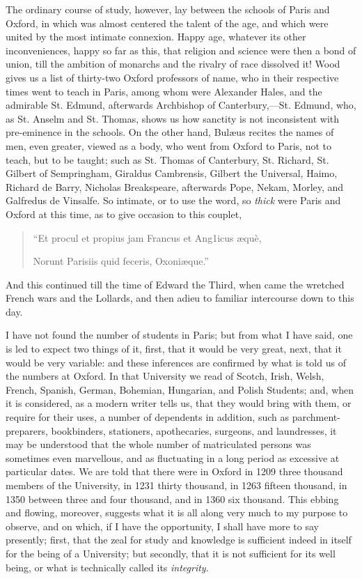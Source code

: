 The ordinary course of study,
however, lay between the schools of Paris and Oxford, in which
was almost centered the talent of the age, and which were united by
the most intimate connexion. Happy age, whatever its other
inconveniences, happy so far as this, that religion and science were
then a bond of union, till the ambition of monarchs and the rivalry of
race dissolved it! Wood gives us a list of thirty-two Oxford
professors of name, who in their respective times went to teach in
Paris, among whom were Alexander Hales, and the admirable St. Edmund,
afterwards Archbishop of Canterbury,—St. Edmund, who, as St. Anselm
and St. Thomas, shows us how sanctity is not inconsistent with
pre-eminence in the schools. On the other hand, Bulæus recites the
names of men, even greater, viewed as a body, who went from Oxford to
Paris, not to teach, but to be taught; such as St. Thomas of
Canterbury, St. Richard, St. Gilbert of Sempringham, Giraldus
Cambrensis, Gilbert the Universal, Haimo, Richard de Barry, Nicholas
Breakspeare, afterwards Pope, Nekam, Morley, and Galfredus de Vinsalfe.
So intimate, or to use the word, so \emph{thick} were Paris and Oxford at
this time, as to give occasion to this couplet,

\begin{quote}

``Et procul et propius jam
Francus et Ang1icus æquè,

Norunt Parisiis quid feceris, Oxoniæque.''

\end{quote}

And this continued till the
time of Edward the Third, when came the wretched French wars and the
Lollards, and then adieu to familiar intercourse down to this day.

I have not found the number of
students in Paris; but from what I have said, one is led to expect two
things of it, first, that it would be very great, next, that it would
be very variable: and these inferences are confirmed by what is told
us of the numbers at Oxford. In that University we read of
Scotch, Irish, Welsh, French, Spanish, German, Bohemian, Hungarian,
and Polish Students; and, when it is considered, as a modern writer
tells us, that they would bring with them, or require for their uses,
a number of dependents in addition, such as parchment-preparers,
bookbinders, stationers, apothecaries, surgeons, and laundresses, it
may be understood that the whole number of matriculated persons was
sometimes even marvellous, and as fluctuating in a long period as
excessive at particular dates. We are told that there were in Oxford
in 1209 three thousand members of the University, in 1231 thirty
thousand, in 1263 fifteen thousand, in 1350 between three and four
thousand, and in 1360 six thousand. This ebbing and flowing, moreover,
suggests what it is all along very much to my purpose to observe, and
on which, if I have the opportunity, I shall have more to say
presently; first, that the zeal for study and knowledge is sufficient
indeed in itself for the being of a University; but secondly, that it
is not sufficient for its well being, or what is technically called
its \emph{integrity}.

